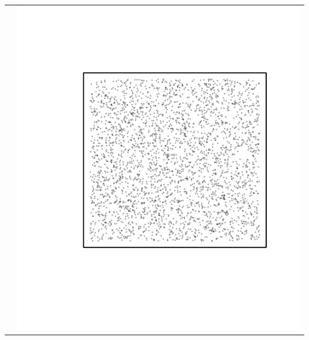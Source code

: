 \documentclass{article}\usepackage{graphicx, color}
\makeatletter
\def\maxwidth{ %
  \ifdim\Gin@nat@width>\linewidth
    \linewidth
  \else
    \Gin@nat@width
  \fi
}
\newenvironment{knitrout}{}{} %
\makeatother
\begin{document}
\begin{tabular}{cc}
&
\begin{knitrout}
\definecolor{shadecolor}{rgb}{0.969, 0.969, 0.969}\color{fgcolor}\includegraphics[width=\maxwidth]{figure/unnamed-chunk-8} 
\end{knitrout}

\\
\end{tabular}
\newpage
\end{document}

